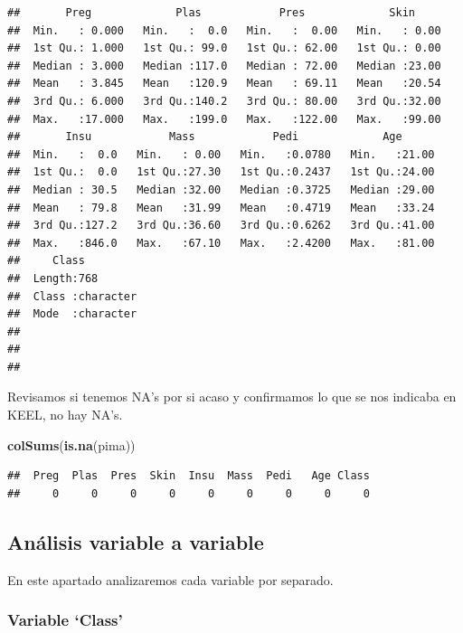 \documentclass[
]{article}
\newenvironment{Shaded}{\begin{snugshade}}{\end{snugshade}}
\newcommand{\FunctionTok}[1]{\textcolor[rgb]{0.13,0.29,0.53}{\textbf{#1}}}
\newcommand{\NormalTok}[1]{#1}
\begin{document}
\begin{verbatim}
##       Preg             Plas            Pres             Skin      
##  Min.   : 0.000   Min.   :  0.0   Min.   :  0.00   Min.   : 0.00  
##  1st Qu.: 1.000   1st Qu.: 99.0   1st Qu.: 62.00   1st Qu.: 0.00  
##  Median : 3.000   Median :117.0   Median : 72.00   Median :23.00  
##  Mean   : 3.845   Mean   :120.9   Mean   : 69.11   Mean   :20.54  
##  3rd Qu.: 6.000   3rd Qu.:140.2   3rd Qu.: 80.00   3rd Qu.:32.00  
##  Max.   :17.000   Max.   :199.0   Max.   :122.00   Max.   :99.00  
##       Insu            Mass            Pedi             Age       
##  Min.   :  0.0   Min.   : 0.00   Min.   :0.0780   Min.   :21.00  
##  1st Qu.:  0.0   1st Qu.:27.30   1st Qu.:0.2437   1st Qu.:24.00  
##  Median : 30.5   Median :32.00   Median :0.3725   Median :29.00  
##  Mean   : 79.8   Mean   :31.99   Mean   :0.4719   Mean   :33.24  
##  3rd Qu.:127.2   3rd Qu.:36.60   3rd Qu.:0.6262   3rd Qu.:41.00  
##  Max.   :846.0   Max.   :67.10   Max.   :2.4200   Max.   :81.00  
##     Class          
##  Length:768        
##  Class :character  
##  Mode  :character  
##                    
##                    
## 
\end{verbatim}

Revisamos si tenemos NA's por si acaso y confirmamos lo que se nos
indicaba en KEEL, no hay NA's.

\begin{Shaded}
\begin{Highlighting}[]
\FunctionTok{colSums}\NormalTok{(}\FunctionTok{is.na}\NormalTok{(pima))}
\end{Highlighting}
\end{Shaded}

\begin{verbatim}
##  Preg  Plas  Pres  Skin  Insu  Mass  Pedi   Age Class 
##     0     0     0     0     0     0     0     0     0
\end{verbatim}

\hypertarget{anuxe1lisis-variable-a-variable}{%
\subsection{Análisis variable a
variable}\label{anuxe1lisis-variable-a-variable}}

En este apartado analizaremos cada variable por separado.

\hypertarget{variable-class}{%
\subsubsection{Variable `Class'}\label{variable-class}}
\end{document}
